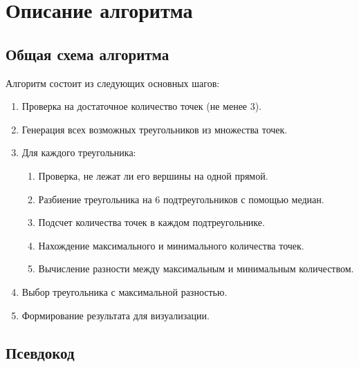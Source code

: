 \documentclass[a4paper,12pt]{article}
\begin{document}
\section{Описание алгоритма}

\subsection{Общая схема алгоритма}

Алгоритм состоит из следующих основных шагов:
\begin{enumerate}
    \item Проверка на достаточное количество точек (не менее 3).
    \item Генерация всех возможных треугольников из множества точек.
    \item Для каждого треугольника:
    \begin{enumerate}
        \item Проверка, не лежат ли его вершины на одной прямой.
        \item Разбиение треугольника на 6 подтреугольников с помощью медиан.
        \item Подсчет количества точек в каждом подтреугольнике.
        \item Нахождение максимального и минимального количества точек.
        \item Вычисление разности между максимальным и минимальным количеством.
    \end{enumerate}
    \item Выбор треугольника с максимальной разностью.
    \item Формирование результата для визуализации.
\end{enumerate}

\newpage
\subsection{Псевдокод}
\end{document}
